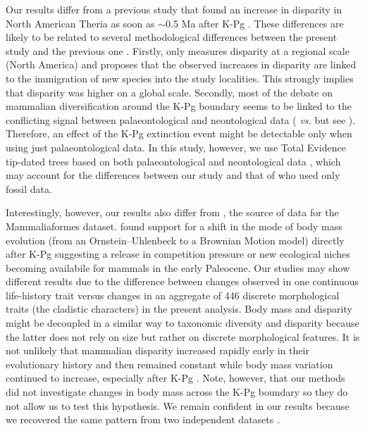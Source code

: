 \documentclass[12pt,letterpaper]{article}
\begin{document}
Our results differ from a previous study that found an increase in disparity in North American Theria as soon as $\sim$0.5 Ma after K-Pg \citep{Wilson2013}.
These differences are likely to be related to several methodological differences between the present study and the previous one \citep{Wilson2013}.
Firstly, \cite{Wilson2013} only measures disparity at a regional scale (North America) and proposes that the observed increases in disparity are linked to the immigration of new species into the study localities.
This strongly implies that disparity was higher on a global scale.
Secondly, most of the debate on mammalian diversification around the K-Pg boundary seems to be linked to the conflicting signal between palaeontological and neontological data (\citealt{meredithimpacts2011} \textit{vs.} \citealt{OLeary08022013} but see \citealt{dosReis2014}).
Therefore, an effect of the K-Pg extinction event might be detectable only when using just palaeontological data.
In this study, however, we use Total Evidence tip-dated trees based on both palaeontological and neontological data \citep{Slater2012MEE,beckancient2014}, which may account for the differences between our study and that of \cite{Wilson2013} who used only fossil data.

Interestingly, however, our results also differ from \cite{Slater2012MEE}, the source of data for the Mammaliaformes dataset.
\cite{Slater2012MEE} found support for a shift in the mode of body mass evolution (from an Ornstein--Uhlenbeck to a Brownian Motion model) directly after K-Pg suggesting a release in competition pressure or new ecological niches becoming availabile for mammals in the early Paleocene.
Our studies may show different results due to the difference between changes observed in one continuous life-history trait \citep[body mass;][]{Slater2012MEE} versus changes in an aggregate of 446 discrete morphological traits (the cladistic characters) in the present analysis.
Body mass and disparity might be decoupled in a similar way to taxonomic diversity and disparity \citep[e.g.][]{slaterCetacean,ruta2013,hopkinsdecoupling2013} because the latter does not rely on size but rather on discrete morphological features.
It is not unlikely that mammalian disparity increased rapidly early in their evolutionary history and then remained constant \citep[Figure \ref{fig:Fig_Raw_results};][]{Close2015,Lee2015R759} while body mass variation continued to increase, especially after K-Pg \citep{Slater2012MEE}.
Note, however, that our methods did not investigate changes in body mass across the K-Pg boundary so they do not allow us to test this hypothesis.
We remain confident in our results because we recovered the same pattern from two independent datasets \citep{Slater2012MEE,beckancient2014}.
\end{document}
